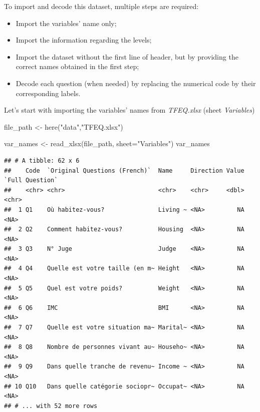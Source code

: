 \documentclass[
]{book}
\newenvironment{Shaded}{\begin{snugshade}}{\end{snugshade}}
\newcommand{\AttributeTok}[1]{\textcolor[rgb]{0.77,0.63,0.00}{#1}}
\newcommand{\FunctionTok}[1]{\textcolor[rgb]{0.00,0.00,0.00}{#1}}
\newcommand{\NormalTok}[1]{#1}
\newcommand{\OtherTok}[1]{\textcolor[rgb]{0.56,0.35,0.01}{#1}}
\newcommand{\StringTok}[1]{\textcolor[rgb]{0.31,0.60,0.02}{#1}}
\providecommand{\tightlist}{%
  \setlength{\itemsep}{0pt}\setlength{\parskip}{0pt}}
\begin{document}
To import and decode this dataset, multiple steps are required:

\begin{itemize}
\tightlist
\item
  Import the variables' name only;
\item
  Import the information regarding the levels;
\item
  Import the dataset without the first line of header, but by providing the correct names obtained in the first step;
\item
  Decode each question (when needed) by replacing the numerical code by their corresponding labels.
\end{itemize}

Let's start with importing the variables' names from \emph{TFEQ.xlsx} (sheet \emph{Variables})

\begin{Shaded}
\begin{Highlighting}[]
\NormalTok{file\_path }\OtherTok{\textless{}{-}} \FunctionTok{here}\NormalTok{(}\StringTok{"data"}\NormalTok{,}\StringTok{"TFEQ.xlsx"}\NormalTok{) }

\NormalTok{var\_names }\OtherTok{\textless{}{-}} \FunctionTok{read\_xlsx}\NormalTok{(file\_path, }\AttributeTok{sheet=}\StringTok{"Variables"}\NormalTok{)}
\NormalTok{var\_names}
\end{Highlighting}
\end{Shaded}

\begin{verbatim}
## # A tibble: 62 x 6
##    Code  `Original Questions (French)`  Name     Direction Value `Full Question`
##    <chr> <chr>                          <chr>    <chr>     <dbl> <chr>          
##  1 Q1    Où habitez-vous?               Living ~ <NA>         NA <NA>           
##  2 Q2    Comment habitez-vous?          Housing  <NA>         NA <NA>           
##  3 Q3    N° Juge                        Judge    <NA>         NA <NA>           
##  4 Q4    Quelle est votre taille (en m~ Height   <NA>         NA <NA>           
##  5 Q5    Quel est votre poids?          Weight   <NA>         NA <NA>           
##  6 Q6    IMC                            BMI      <NA>         NA <NA>           
##  7 Q7    Quelle est votre situation ma~ Marital~ <NA>         NA <NA>           
##  8 Q8    Nombre de personnes vivant au~ Househo~ <NA>         NA <NA>           
##  9 Q9    Dans quelle tranche de revenu~ Income ~ <NA>         NA <NA>           
## 10 Q10   Dans quelle catégorie sociopr~ Occupat~ <NA>         NA <NA>           
## # ... with 52 more rows
\end{verbatim}
\end{document}
